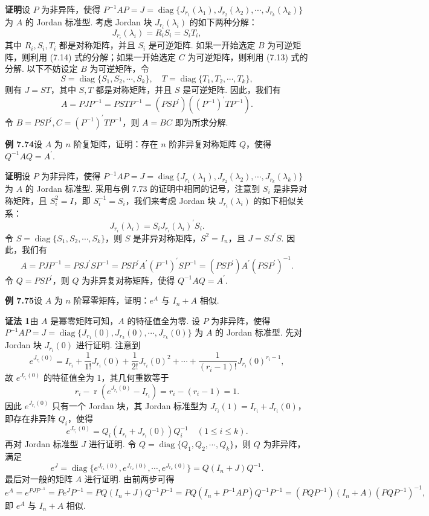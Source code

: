 \documentclass[UTF8,12pt,a4paper,fontset=fandol]{ctexart}
\begin{document}
\noindent\textbf{证明}\quad 设 $P$ 为非异阵，使得 $P^{-1}AP=J=\operatorname{diag}\{J_{r_1}(\lambda_1),J_{r_2}(\lambda_2),\cdots,J_{r_k}(\lambda_k)\}$ 为 $A$ 的 Jordan 标准型. 考虑 Jordan 块 $J_{r_i}(\lambda_i)$ 的如下两种分解：
\[
J_{r_i}(\lambda_i)=R_iS_i=S_iT_i,
\tag{7.13--7.14}
\]
其中 $R_i,S_i,T_i$ 都是对称矩阵，并且 $S_i$ 是可逆矩阵. 如果一开始选定 $B$ 为可逆矩阵，则利用 (7.14) 式的分解；如果一开始选定 $C$ 为可逆矩阵，则利用 (7.13) 式的分解. 以下不妨设定 $B$ 为可逆矩阵，令
\[
S=\operatorname{diag}\{S_1,S_2,\cdots,S_k\},\quad T=\operatorname{diag}\{T_1,T_2,\cdots,T_k\},
\]
则有 $J=ST$，其中 $S,T$ 都是对称矩阵，并且 $S$ 是可逆矩阵. 因此，我们有
\[
A=PJP^{-1}=PSTP^{-1}=(PSP^{\prime})((P^{-1})^{\prime}TP^{-1}).
\]
令 $B=PSP^{\prime},C=(P^{-1})^{\prime}TP^{-1}$，则 $A=BC$ 即为所求分解.

\noindent\textbf{例 7.74}\quad 设 $A$ 为 $n$ 阶复矩阵，证明：存在 $n$ 阶非异复对称矩阵 $Q$，使得 $Q^{-1}AQ=A^{\prime}$.

\noindent\textbf{证明}\quad 设 $P$ 为非异阵，使得 $P^{-1}AP=J=\operatorname{diag}\{J_{r_1}(\lambda_1),J_{r_2}(\lambda_2),\cdots,J_{r_k}(\lambda_k)\}$ 为 $A$ 的 Jordan 标准型. 采用与例 7.73 的证明中相同的记号，注意到 $S_i$ 是非异对称矩阵，且 $S_i^2=I$，即 $S_i^{-1}=S_i$，我们来考虑 Jordan 块 $J_{r_i}(\lambda_i)$ 的如下相似关系：
\[
J_{r_i}(\lambda_i)=S_iJ_{r_i}(\lambda_i)^{\prime}S_i.
\]
令 $S=\operatorname{diag}\{S_1,S_2,\cdots,S_k\}$，则 $S$ 是非异对称矩阵，$S^2=I_n$，且 $J=SJ^{\prime}S$. 因此，我们有
\[
A=PJP^{-1}=PSJ^{\prime}SP^{-1}=PSP^{\prime}A^{\prime}(P^{-1})^{\prime}SP^{-1}=(PSP^{\prime})A^{\prime}(PSP^{\prime})^{-1}.
\]
令 $Q=PSP^{\prime}$，则 $Q$ 为非异复对称矩阵，使得 $Q^{-1}AQ=A^{\prime}$.

\noindent\textbf{例 7.75}\quad 设 $A$ 为 $n$ 阶幂零矩阵，证明：$e^A$ 与 $I_n+A$ 相似.

\noindent\textbf{证法 1}\quad 由 $A$ 是幂零矩阵可知，$A$ 的特征值全为零. 设 $P$ 为非异阵，使得 $P^{-1}AP=J=\operatorname{diag}\{J_{r_1}(0),J_{r_2}(0),\cdots,J_{r_k}(0)\}$ 为 $A$ 的 Jordan 标准型. 先对 Jordan 块 $J_{r_i}(0)$ 进行证明. 注意到
\[
e^{J_{r_i}(0)}=I_{r_i}+\frac1{1!}J_{r_i}(0)+\frac1{2!}J_{r_i}(0)^2+\cdots+\frac1{(r_i-1)!}J_{r_i}(0)^{r_i-1},
\]
故 $e^{J_{r_i}(0)}$ 的特征值全为 1，其几何重数等于
\[
r_i-\operatorname{r}(e^{J_{r_i}(0)}-I_{r_i})=r_i-(r_i-1)=1.
\]
因此 $e^{J_{r_i}(0)}$ 只有一个 Jordan 块，其 Jordan 标准型为 $J_{r_i}(1)=I_{r_i}+J_{r_i}(0)$，即存在非异阵 $Q_i$，使得
\[
e^{J_{r_i}(0)}=Q_i(I_{r_i}+J_{r_i}(0))Q_i^{-1}\quad (1\le i\le k).
\]
再对 Jordan 标准型 $J$ 进行证明. 令 $Q=\operatorname{diag}\{Q_1,Q_2,\cdots,Q_k\}$，则 $Q$ 为非异阵，满足
\[
e^J=\operatorname{diag}\{e^{J_{r_1}(0)},e^{J_{r_2}(0)},\cdots,e^{J_{r_k}(0)}\}=Q(I_n+J)Q^{-1}.
\]
最后对一般的矩阵 $A$ 进行证明. 由前两步可得
\[
e^A=e^{PJP^{-1}}=Pe^JP^{-1}=PQ(I_n+J)Q^{-1}P^{-1}
=PQ(I_n+P^{-1}AP)Q^{-1}P^{-1}=(PQP^{-1})(I_n+A)(PQP^{-1})^{-1},
\]
即 $e^A$ 与 $I_n+A$ 相似.
\end{document}
